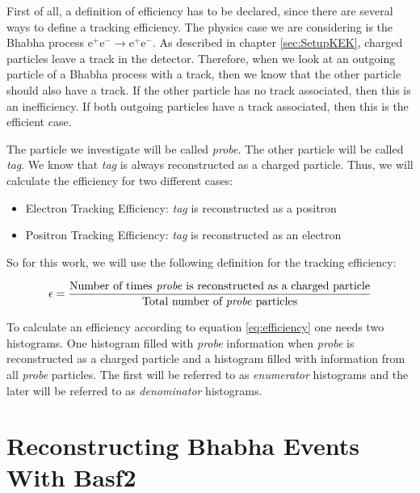 \documentclass[a4paper,11pt,twosided,final,german,openbib,pdftex,listof=totoc,bibliography=totoc]{scrbook}
\begin{document}
First of all, a definition of efficiency has to be declared, since there are several ways to define a tracking efficiency. The physics case we are considering is the Bhabha process $ \textrm{e}^+ \textrm{e}^- \rightarrow \textrm{e}^+ \textrm{e}^- $. As described in chapter \ref{sec:SetupKEK}, charged particles leave a track in the detector. Therefore, when we look at an outgoing particle of a Bhabha process with a track, then we know that the other particle should also have a track. If the other particle has no track associated, then this is an inefficiency. If both outgoing particles have a track associated, then this is the efficient case.


The particle we investigate will be called \textit{probe}. The other particle will be called \textit{tag}. We know that \textit{tag} is always reconstructed as a charged particle. Thus, we will calculate the efficiency for two different cases:

\begin{itemize}
	
	\item Electron Tracking Efficiency: \textit{tag} is reconstructed as a positron
	\item Positron Tracking Efficiency: \textit{tag} is reconstructed as an electron
\end{itemize}






So for this work, we will use the following definition for the tracking efficiency:

\begin{equation}
	\epsilon = \frac{\textrm{Number of times \textit{probe} is reconstructed as a charged particle}}{\textrm{Total number of \textit{probe} particles}}
	\label{eq:efficiency}
\end{equation}


To calculate an efficiency according to equation \ref{eq:efficiency} one needs two histograms. One histogram filled with \textit{probe} information when \textit{probe} is reconstructed as a charged particle and a histogram filled with information from all \textit{probe} particles. The first will be referred to as \textit{enumerator} histograms and the later will be referred to as \textit{denominator} histograms.




\section{Reconstructing Bhabha Events With Basf2}
\label{sec:RecBasf2}
\end{document}
